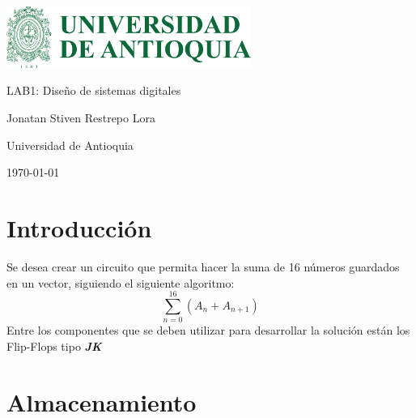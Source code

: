 \documentclass{article}
\begin{document}
\thispagestyle{fancy} %
\begin{titlepage}
    \centering
    \vspace*{2cm}
    {\includegraphics[width=8cm]{imagenes/logo.png}\par} %
    \vspace{1cm}
    {\Huge LAB1: Diseño de sistemas digitales\par}
    \vspace{2cm}
    {\Large Jonatan Stiven Restrepo Lora\par}
    \vspace{0.5cm}
    \vspace{0.5cm}
    {\Large Universidad de Antioquia\par} %
    \vfill
    {\large \today\par}
\end{titlepage}

\section{Introducción}
Se desea crear un circuito que permita hacer la suma de 16 números guardados en un vector, 
siguiendo el siguiente algoritmo:
\[
\sum_{n=0}^{16} (A_n + A_{n+1})
\]
Entre los componentes que se deben utilizar para desarrollar la solución están los Flip-Flops
tipo \textbf{\textit{JK}}

\section{Almacenamiento}
\end{document}
